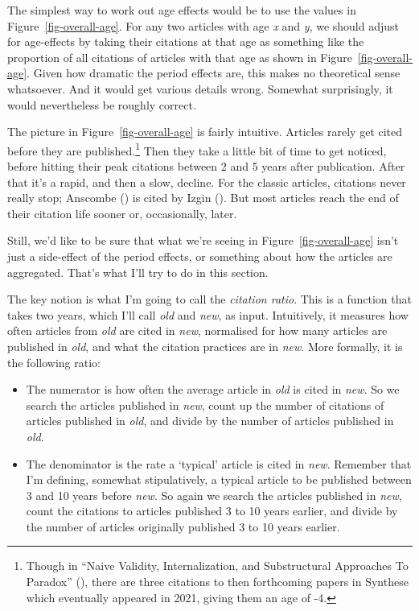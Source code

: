 \documentclass[
  12pt,
  letterpaper,
  DIV=11,
  numbers=noendperiod]{scrartcl}
\providecommand{\tightlist}{%
  \setlength{\itemsep}{0pt}\setlength{\parskip}{0pt}}\usepackage{longtable,booktabs,array}
\begin{document}
The simplest way to work out age effects would be to use the values in
Figure~\ref{fig-overall-age}. For any two articles with age \emph{x} and
\emph{y}, we should adjust for age-effects by taking their citations at
that age as something like the proportion of all citations of articles
with that age as shown in Figure~\ref{fig-overall-age}. Given how
dramatic the period effects are, this makes no theoretical sense
whatsoever. And it would get various details wrong. Somewhat
surprisingly, it would nevertheless be roughly correct.

The picture in Figure~\ref{fig-overall-age} is fairly intuitive.
Articles rarely get cited before they are published.\footnote{Though in
  ``Naive Validity, Internalization, and Substructural Approaches To
  Paradox'' (), there are
  three citations to then forthcoming papers in Synthese which
  eventually appeared in 2021, giving them an age of -4.} Then they take
a little bit of time to get noticed, before hitting their peak citations
between 2 and 5 years after publication. After that it's a rapid, and
then a slow, decline. For the classic articles, citations never really
stop; Anscombe () is cited by Izgin
(). But most articles reach the end of
their citation life sooner or, occasionally, later.

Still, we'd like to be sure that what we're seeing in
Figure~\ref{fig-overall-age} isn't just a side-effect of the period
effects, or something about how the articles are aggregated. That's what
I'll try to do in this section.

The key notion is what I'm going to call the \emph{citation ratio}. This
is a function that takes two years, which I'll call \emph{old} and
\emph{new}, as input. Intuitively, it measures how often articles from
\emph{old} are cited in \emph{new}, normalised for how many articles are
published in \emph{old}, and what the citation practices are in
\emph{new}. More formally, it is the following ratio:

\begin{itemize}
\tightlist
\item
  The numerator is how often the average article in \emph{old} is cited
  in \emph{new}. So we search the articles published in \emph{new},
  count up the number of citations of articles published in \emph{old},
  and divide by the number of articles published in \emph{old}.
\item
  The denominator is the rate a `typical' article is cited in
  \emph{new}. Remember that I'm defining, somewhat stipulatively, a
  typical article to be published between 3 and 10 years before
  \emph{new}. So again we search the articles published in \emph{new},
  count the citations to articles published 3 to 10 years earlier, and
  divide by the number of articles originally published 3 to 10 years
  earlier.
\end{itemize}
\end{document}
